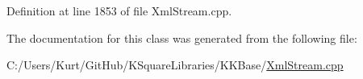 Definition at line 1853 of file Xml\+Stream.\+cpp.



The documentation for this class was generated from the following file\+:\begin{DoxyCompactItemize}
\item 
C\+:/\+Users/\+Kurt/\+Git\+Hub/\+K\+Square\+Libraries/\+K\+K\+Base/\hyperlink{_xml_stream_8cpp}{Xml\+Stream.\+cpp}\end{DoxyCompactItemize}
